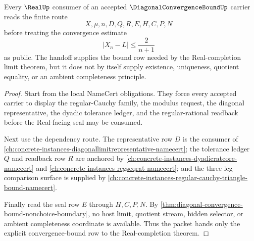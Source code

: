 \begin{theorem}
\label{thm:diagonal-convergence-bound-real-completion-handoff}
Every $\RealUp$ consumer of an accepted $\DiagonalConvergenceBoundUp$ carrier reads the finite route
$$
X,\mu,n,D,Q,R,E,H,C,P,N
$$
before treating the convergence estimate
$$
|X_n-L| \leq \frac{2}{n+1}
$$
as public. The handoff supplies the bound row needed by the Real-completion limit theorem, but it does not by itself supply existence, uniqueness, quotient equality, or an ambient completeness principle.
\end{theorem}
\begin{proof}
Start from the local NameCert obligations. They force every accepted carrier to display the regular-Cauchy family, the modulus request, the diagonal representative, the dyadic tolerance ledger, and the regular-rational readback before the Real-facing seal may be consumed.

Next use the dependency route. The representative row $D$ is the consumer of \autoref{ch:concrete-instances-diagonallimitrepresentative-namecert}; the tolerance ledger $Q$ and readback row $R$ are anchored by \autoref{ch:concrete-instances-dyadicratcore-namecert} and \autoref{ch:concrete-instances-regseqrat-namecert}; and the three-leg comparison surface is supplied by \autoref{ch:concrete-instances-regular-cauchy-triangle-bound-namecert}.

Finally read the seal row $E$ through $H,C,P,N$. By \autoref{thm:diagonal-convergence-bound-nonchoice-boundary}, no host limit, quotient stream, hidden selector, or ambient completeness coordinate is available. Thus the packet hands only the explicit convergence-bound row to the Real-completion theorem.
\end{proof}


